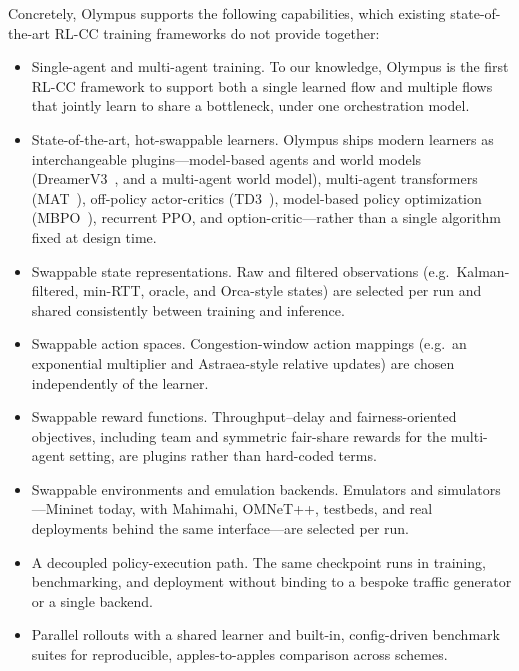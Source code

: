 Concretely, Olympus supports the following capabilities, which existing
state-of-the-art RL-CC training frameworks do not provide together:

\begin{itemize}
  \item Single-agent and multi-agent training. To our knowledge, Olympus is the
        first RL-CC framework to support both a single learned flow and multiple
        flows that jointly learn to share a bottleneck, under one orchestration
        model.
  \item State-of-the-art, hot-swappable learners. Olympus ships modern learners
        as interchangeable plugins---model-based agents and world models
        (DreamerV3~\cite{dreamerv3}, and a multi-agent world model), multi-agent
        transformers (MAT~\cite{mat}), off-policy actor-critics
        (TD3~\cite{td3}), model-based policy optimization (MBPO~\cite{mbpo}),
        recurrent PPO, and option-critic---rather than a single algorithm fixed
        at design time.
  \item Swappable state representations. Raw and filtered observations (e.g.\
        Kalman-filtered, min-RTT, oracle, and Orca-style states) are selected
        per run and shared consistently between training and inference.
  \item Swappable action spaces. Congestion-window action mappings (e.g.\ an
        exponential multiplier and Astraea-style relative updates) are chosen
        independently of the learner.
  \item Swappable reward functions. Throughput--delay and fairness-oriented
        objectives, including team and symmetric fair-share rewards for the
        multi-agent setting, are plugins rather than hard-coded terms.
  \item Swappable environments and emulation backends. Emulators and
        simulators---Mininet today, with Mahimahi, OMNeT++, testbeds, and real
        deployments behind the same interface---are selected per run.
  \item A decoupled policy-execution path. The same checkpoint runs in training,
        benchmarking, and deployment without binding to a bespoke traffic
        generator or a single backend.
  \item Parallel rollouts with a shared learner and built-in, config-driven
        benchmark suites for reproducible, apples-to-apples comparison across
        schemes.
\end{itemize}

